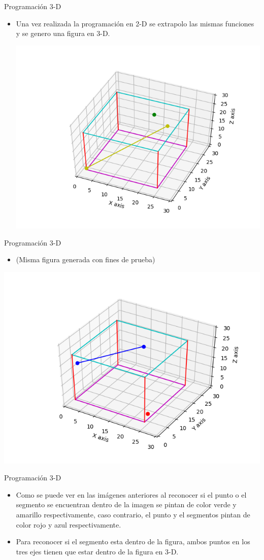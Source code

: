 \documentclass{beamer}
\begin{document}
\begin{frame}{Programación 3-D}
 \begin{itemize}
  \item Una vez realizada la programación en 2-D se extrapolo las mismas funciones y se genero una figura en 3-D.
  
  \includegraphics[width=0.6\linewidth]{Figure_3-D_dentro}
 \end{itemize}
\end{frame}

\begin{frame}{Programación 3-D}
  \begin{itemize}
   \item (Misma figura generada con fines de prueba)
  \end{itemize}
  \includegraphics[width=0.6\linewidth]{Figure_3-D_fuera}
\end{frame}

\begin{frame}{Programación 3-D}
  \begin{itemize}
   \item Como se puede ver en las imágenes anteriores al reconocer si el punto o el segmento se encuentran dentro de la imagen se pintan de color verde y amarillo respectivamente, caso contrario, el punto y el segmentos pintan de color rojo y azul respectivamente.
   \item Para reconocer si el segmento esta dentro de la figura, ambos puntos en los tres ejes tienen que estar dentro de la figura en 3-D.
  \end{itemize}
\end{frame}
\end{document}
